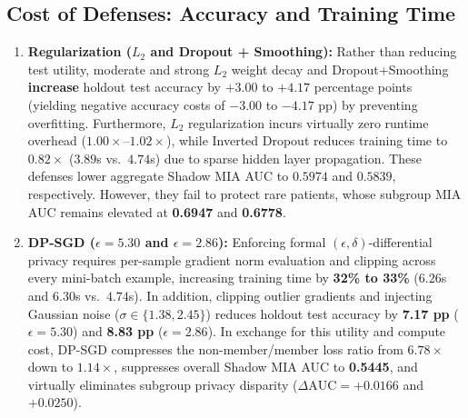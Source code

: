 \documentclass[10pt,twocolumn]{article}
\begin{document}
\subsection{Cost of Defenses: Accuracy and Training Time}
\begin{enumerate}
    \item \textbf{Regularization ($L_2$ and Dropout + Smoothing):} Rather than reducing test utility, moderate and strong $L_2$ weight decay and Dropout+Smoothing \textbf{increase} holdout test accuracy by $+3.00$ to $+4.17$ percentage points (yielding negative accuracy costs of $-3.00$ to $-4.17$ pp) by preventing overfitting. Furthermore, $L_2$ regularization incurs virtually zero runtime overhead ($1.00\times$--$1.02\times$), while Inverted Dropout reduces training time to $0.82\times$ ($3.89$s vs.\ $4.74$s) due to sparse hidden layer propagation. These defenses lower aggregate Shadow MIA AUC to $0.5974$ and $0.5839$, respectively. However, they fail to protect rare patients, whose subgroup MIA AUC remains elevated at \textbf{0.6947} and \textbf{0.6778}.
    \item \textbf{DP-SGD ($\epsilon=5.30$ and $\epsilon=2.86$):} Enforcing formal $(\epsilon, \delta)$-differential privacy requires per-sample gradient norm evaluation and clipping across every mini-batch example, increasing training time by \textbf{32\% to 33\%} ($6.26$s and $6.30$s vs.\ $4.74$s). In addition, clipping outlier gradients and injecting Gaussian noise ($\sigma \in \{1.38, 2.45\}$) reduces holdout test accuracy by \textbf{7.17 pp} ($\epsilon=5.30$) and \textbf{8.83 pp} ($\epsilon=2.86$). In exchange for this utility and compute cost, DP-SGD compresses the non-member/member loss ratio from $6.78\times$ down to $1.14\times$, suppresses overall Shadow MIA AUC to \textbf{0.5445}, and virtually eliminates subgroup privacy disparity ($\Delta\text{AUC} = +0.0166$ and $+0.0250$).
\end{enumerate}
\end{document}
